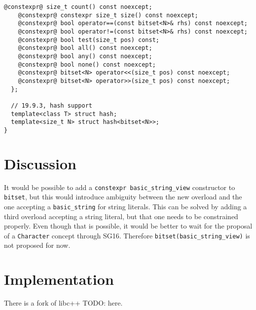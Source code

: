 \documentclass[ebook,11pt,article,a4paper]{memoir}
\begin{document}
\begin{lstlisting}[style=cppdiff]
    @constexpr@ size_t count() const noexcept;
    @constexpr@ constexpr size_t size() const noexcept;
    @constexpr@ bool operator==(const bitset<N>& rhs) const noexcept;
    @constexpr@ bool operator!=(const bitset<N>& rhs) const noexcept;
    @constexpr@ bool test(size_t pos) const;
    @constexpr@ bool all() const noexcept;
    @constexpr@ bool any() const noexcept;
    @constexpr@ bool none() const noexcept;
    @constexpr@ bitset<N> operator<<(size_t pos) const noexcept;
    @constexpr@ bitset<N> operator>>(size_t pos) const noexcept;
  };

  // 19.9.3, hash support
  template<class T> struct hash;
  template<size_t N> struct hash<bitset<N>>;
}
\end{lstlisting}

\chapter{Discussion}
It would be possible to add a \texttt{constexpr basic\_string\_view} constructor to \texttt{bitset}, but this would introduce ambiguity between the new overload and the one accepting a \texttt{basic\_string} for string literals. This can be solved by adding a third overload accepting a string literal, but that one needs to be constrained properly. Even though that is possible, it would be better to wait for the proposal of a \texttt{Character} concept through SG16. Therefore \texttt{bitset(basic\_string\_view)} is not proposed for now.

\chapter{Implementation}
There is a fork of libc++ TODO: here.
\end{document}
